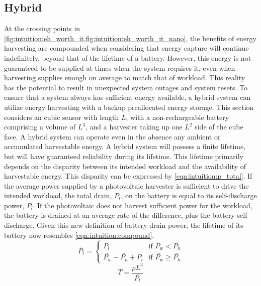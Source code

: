 
\subsection{Hybrid}
\label{sec:intuition:hybrid}
At the crossing points in \cref{fig:intuition:eh_worth_it,fig:intuition:eh_worth_it_nano}, the benefits of energy harvesting are compounded when considering that energy capture will continue indefinitely, beyond that of the lifetime of a battery.
However, this energy is not guaranteed to be supplied at times when the system requires it, even when harvesting supplies enough on average to match that of workload. This reality has the potential to result in unexpected system outages and system resets.
To ensure that a system always has sufficient energy available, a hybrid system can utilize energy harvesting with a backup preallocated energy storage. 
This section considers an cubic sensor with length $L$, with a non-rechargeable battery comprising a volume of $L^3$, and a harvester taking up one $L^2$ side of the cube face.
A hybrid system can operate even in the absence any ambient or accumulated harvestable energy. A hybrid system will possess a finite lifetime, but will have guaranteed reliability during its lifetime. 
This lifetime primarily depends on the disparity between its intended workload and the availability of harvestable energy.
This disparity can be expressed by \cref{eqn:intuition:p_total}. 
If the average power supplied by a photovoltaic harvester is sufficient to drive the intended workload, the total drain, $P_t$, on the battery is equal to its self-discharge power, $P_l$. 
If the photovoltaic does not harvest sufficient power for the workload, the battery is drained at an average rate of the difference, plus the battery self-discharge.
Given this new definition of battery drain power, the lifetime of its battery now resembles \cref{eqn:intuition:compound}.
\begin{equation} \label{eqn:intuition:p_total}
    \bar{P_t} = 
    \begin{cases}
        P_l & \text{if $\bar{P_w} < \bar{P_h}$} \\
        \bar{P_w} - \bar{P_h} + P_l & \text{if $\bar{P_w} \geq \bar{P_h}$}
    \end{cases}
\end{equation}
\begin{equation} \label{eqn:intuition:compound}
T = \frac{\rho L^3}{\bar{P_t}}
\end{equation}
